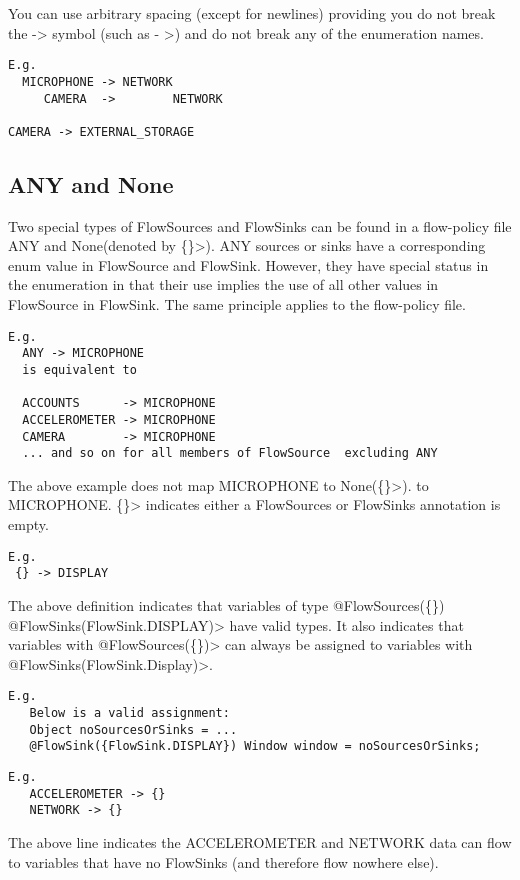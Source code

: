 You can use arbitrary spacing (except for newlines) providing you do not break
the -> symbol (such as - >) and do not break any of the enumeration names.

\begin{Verbatim}
E.g.
  MICROPHONE -> NETWORK
     CAMERA  ->        NETWORK

CAMERA -> EXTERNAL_STORAGE
\end{Verbatim}

\subsection{ANY and None}

Two special types of FlowSources and FlowSinks can be found in
a flow-policy file ANY and None(denoted by \<\{\}>).  ANY sources or sinks
have a corresponding enum value in FlowSource and FlowSink.
However, they have special status in the enumeration in that
their use implies the use of all other values in FlowSource
in FlowSink.  The same principle applies to the flow-policy file.
\begin{Verbatim}
E.g.
  ANY -> MICROPHONE
  is equivalent to

  ACCOUNTS      -> MICROPHONE
  ACCELEROMETER -> MICROPHONE
  CAMERA        -> MICROPHONE
  ... and so on for all members of FlowSource  excluding ANY
\end{Verbatim}

The above example does not map MICROPHONE to None(\<\{\}>).
to MICROPHONE. \<\{\}> indicates either a FlowSources or FlowSinks
annotation is empty.
\begin{Verbatim}
E.g.
 {} -> DISPLAY
\end{Verbatim}
The above definition indicates that variables of type
\<@FlowSources(\{\}) @FlowSinks(FlowSink.DISPLAY)> have valid
types. It also indicates that variables with
\<@FlowSources(\{\})> can always be assigned to variables with
\<@FlowSinks(FlowSink.Display)>.

\begin{Verbatim}
E.g.
   Below is a valid assignment:
   Object noSourcesOrSinks = ...
   @FlowSink({FlowSink.DISPLAY}) Window window = noSourcesOrSinks;
\end{Verbatim}

\begin{Verbatim}
E.g.
   ACCELEROMETER -> {}
   NETWORK -> {}
\end{Verbatim}

The above line indicates the ACCELEROMETER and NETWORK
data can flow to variables that have no FlowSinks (and
therefore flow nowhere else).

